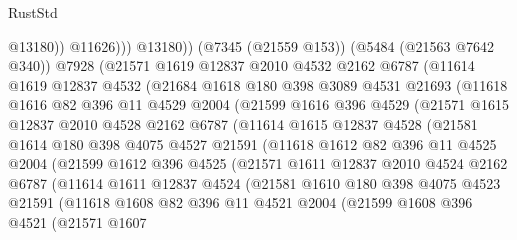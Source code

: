 \begin{lexlean}{RustStd}
\begin{coremodule}
{\begin{coremodule}
{{{{{{{{{{{{{{{{{{{{{{{{{{{{{{{                    @13180))
                @11626)))
          @13180))
      (@7345 (@21559 @153))
      (@5484 (@21563 @7642 @340))
      @7928
      (@21571
        @1619
        @12837
        @2010
        @4532
        @2162
        @6787
        (@11614
          @1619
          @12837
          @4532
          (@21684
            @1618
            @180
            @398
            @3089
            @4531
            @21693
            (@11618
              @1616
              @82
              @396
              @11
              @4529
              @2004
              (@21599
                @1616
                @396
                @4529
                (@21571
                  @1615
                  @12837
                  @2010
                  @4528
                  @2162
                  @6787
                  (@11614
                    @1615
                    @12837
                    @4528
                    (@21581
                      @1614
                      @180
                      @398
                      @4075
                      @4527
                      @21591
                      (@11618
                        @1612
                        @82
                        @396
                        @11
                        @4525
                        @2004
                        (@21599
                          @1612
                          @396
                          @4525
                          (@21571
                            @1611
                            @12837
                            @2010
                            @4524
                            @2162
                            @6787
                            (@11614
                              @1611
                              @12837
                              @4524
                              (@21581
                                @1610
                                @180
                                @398
                                @4075
                                @4523
                                @21591
                                (@11618
                                  @1608
                                  @82
                                  @396
                                  @11
                                  @4521
                                  @2004
                                  (@21599
                                    @1608
                                    @396
                                    @4521
                                    (@21571
                                      @1607
}}}}}}}}}}}}}}}}}}}}}}}}}}}}}}}
\end{coremodule}}
\end{coremodule}
\end{lexlean}
